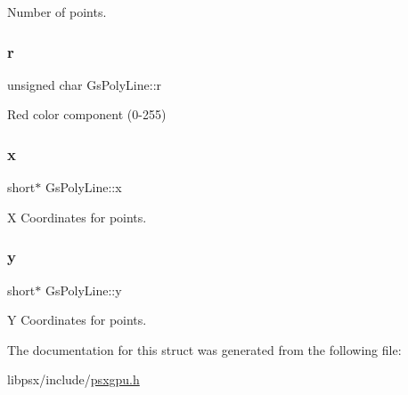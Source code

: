 Number of points. 

\mbox{\label{structGsPolyLine_a952fee47dff8f921dc3ed3696c11f45f}} 
\subsubsection{\texorpdfstring{r}{r}}
{\footnotesize\ttfamily unsigned char Gs\+Poly\+Line\+::r}



Red color component (0-\/255) 

\mbox{\label{structGsPolyLine_a59e6713f08107aab17305c134e8125d8}} 
\subsubsection{\texorpdfstring{x}{x}}
{\footnotesize\ttfamily short$\ast$ Gs\+Poly\+Line\+::x}



X Coordinates for points. 

\mbox{\label{structGsPolyLine_a994b4bf37b4107426d1edaccd58997cd}} 
\subsubsection{\texorpdfstring{y}{y}}
{\footnotesize\ttfamily short$\ast$ Gs\+Poly\+Line\+::y}



Y Coordinates for points. 



The documentation for this struct was generated from the following file\+:\begin{DoxyCompactItemize}
\item 
libpsx/include/\hyperlink{psxgpu_8h}{psxgpu.\+h}\end{DoxyCompactItemize}
